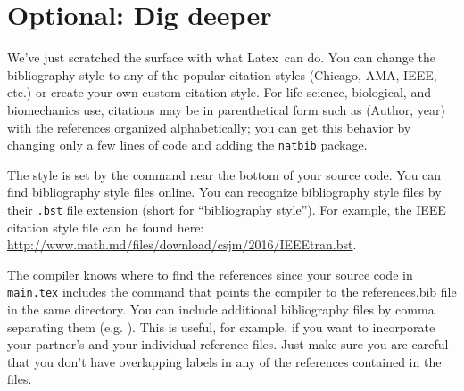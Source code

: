 \documentclass[10pt]{article}
\renewcommand{\LaTeX}{Latex}
\begin{document}
\section{Optional: Dig deeper}
We’ve just scratched the surface with what \LaTeX\ can do. You can change the bibliography style to any of the popular citation styles (Chicago, AMA, IEEE, etc.) or create your own custom citation style. For life science, biological, and biomechanics use, citations may be in parenthetical form such as (Author, year) with the references organized alphabetically; you can get this behavior by changing only a few lines of code and adding the \lstinline{natbib} package. 

The style is set by the command \lstinline!! near the bottom of your source code. You can find bibliography style files online. You can recognize bibliography style files by their \lstinline{.bst} file extension (short for ``bibliography style''). For example, the IEEE citation style file can be found here: \url{http://www.math.md/files/download/csjm/2016/IEEEtran.bst}.

The compiler knows where to find the references since your source code in \lstinline{main.tex} includes the command \lstinline!! that points the compiler to the references.bib file in the same directory. You can include additional bibliography files by comma separating them (e.g. \lstinline!!). This is useful, for example, if you want to incorporate your partner’s and your individual reference files. Just make sure you are careful that you don’t have overlapping labels in any of the references contained in the files.



\end{document}
